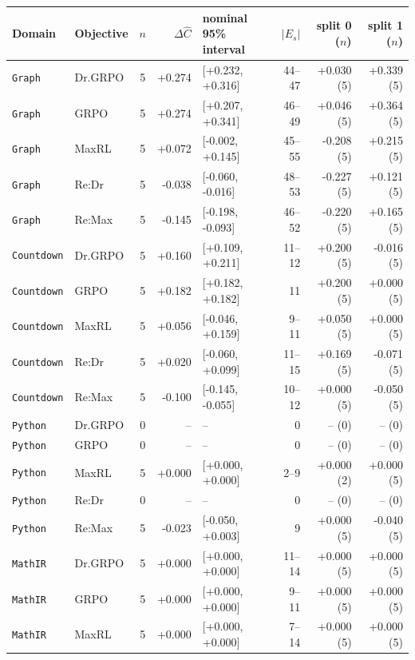 \begin{table}[!htbp]
\centering
\scriptsize
\setlength{\tabcolsep}{3pt}
\begin{tabular}{@{}llcrlrrr@{}}
\toprule
Domain & Objective & $n$ & $\Delta\widehat C$ & nominal 95\% interval & $|E_s|$ & split 0 ($n$) & split 1 ($n$) \\
\midrule
\texttt{Graph} & Dr.GRPO & 5 & +0.274 & [+0.232, +0.316] & 44--47 & +0.030 (5) & +0.339 (5) \\
\texttt{Graph} & GRPO & 5 & +0.274 & [+0.207, +0.341] & 46--49 & +0.046 (5) & +0.364 (5) \\
\texttt{Graph} & MaxRL & 5 & +0.072 & [-0.002, +0.145] & 45--55 & -0.208 (5) & +0.215 (5) \\
\texttt{Graph} & Re:Dr & 5 & -0.038 & [-0.060, -0.016] & 48--53 & -0.227 (5) & +0.121 (5) \\
\texttt{Graph} & Re:Max & 5 & -0.145 & [-0.198, -0.093] & 46--52 & -0.220 (5) & +0.165 (5) \\
\texttt{Countdown} & Dr.GRPO & 5 & +0.160 & [+0.109, +0.211] & 11--12 & +0.200 (5) & -0.016 (5) \\
\texttt{Countdown} & GRPO & 5 & +0.182 & [+0.182, +0.182] & 11 & +0.200 (5) & +0.000 (5) \\
\texttt{Countdown} & MaxRL & 5 & +0.056 & [-0.046, +0.159] & 9--11 & +0.050 (5) & +0.000 (5) \\
\texttt{Countdown} & Re:Dr & 5 & +0.020 & [-0.060, +0.099] & 11--15 & +0.169 (5) & -0.071 (5) \\
\texttt{Countdown} & Re:Max & 5 & -0.100 & [-0.145, -0.055] & 10--12 & +0.000 (5) & -0.050 (5) \\
\texttt{Python} & Dr.GRPO & 0 & -- & -- & 0 & -- (0) & -- (0) \\
\texttt{Python} & GRPO & 0 & -- & -- & 0 & -- (0) & -- (0) \\
\texttt{Python} & MaxRL & 5 & +0.000 & [+0.000, +0.000] & 2--9 & +0.000 (2) & +0.000 (5) \\
\texttt{Python} & Re:Dr & 0 & -- & -- & 0 & -- (0) & -- (0) \\
\texttt{Python} & Re:Max & 5 & -0.023 & [-0.050, +0.003] & 9 & +0.000 (5) & -0.040 (5) \\
\texttt{MathIR} & Dr.GRPO & 5 & +0.000 & [+0.000, +0.000] & 11--14 & +0.000 (5) & +0.000 (5) \\
\texttt{MathIR} & GRPO & 5 & +0.000 & [+0.000, +0.000] & 9--11 & +0.000 (5) & +0.000 (5) \\
\texttt{MathIR} & MaxRL & 5 & +0.000 & [+0.000, +0.000] & 7--14 & +0.000 (5) & +0.000 (5) \\

\end{tabular}
\end{table}
